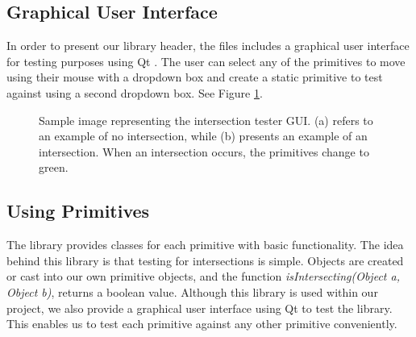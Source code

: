 \subsection{Graphical User Interface}
In order to present our library header, the files includes a graphical user interface for testing purposes using Qt \cite{Qt}. The user can select any of the primitives to move using their mouse with a dropdown box and create a static primitive to test against using a second  dropdown box. See Figure \ref{fig:inter}.
\begin{figure}[t]
\caption{Sample image representing the intersection tester GUI. (a) refers to an example of no intersection, while (b) presents an example of an intersection. When an intersection occurs, the primitives change to green.} \label{fig:inter}
\end{figure}

\subsection{Using Primitives}
The library provides classes for each primitive with basic functionality. The idea behind this library is that testing for intersections is simple. Objects are created or cast into our own primitive objects, and the function \emph{isIntersecting(Object a, Object b)}, returns a boolean value. Although this library is used within our project, we also provide a graphical user interface using Qt to test the library. This enables us to test each primitive against any other primitive conveniently.
\newpage


